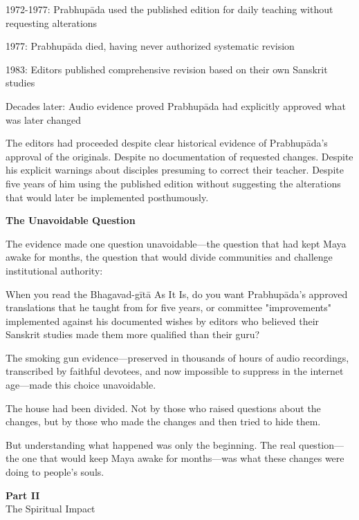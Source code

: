 \documentclass[12pt,twoside]{book}
\makeatletter
\def\cleardoublepage{\clearpage\if@twoside \ifodd\c@page\else\hbox{}\thispagestyle{empty}\newpage\if@twocolumn\hbox{}\newpage\fi\fi\fi}
\makeatother
\begin{document}
1972-1977: Prabhupāda used the published edition for daily teaching without requesting alterations

1977: Prabhupāda died, having never authorized systematic revision

1983: Editors published comprehensive revision based on their own Sanskrit studies

Decades later: Audio evidence proved Prabhupāda had explicitly approved what was later changed

The editors had proceeded despite clear historical evidence of Prabhupāda's approval of the originals. Despite no documentation of requested changes. Despite his explicit warnings about disciples presuming to correct their teacher. Despite five years of him using the published edition without suggesting the alterations that would later be implemented posthumously.


\vspace{0.5cm}
\textbf{The Unavoidable Question}
\vspace{0.2cm}


The evidence made one question unavoidable—the question that had kept Maya awake for months, the question that would divide communities and challenge institutional authority:

When you read the Bhagavad-gītā As It Is, do you want Prabhupāda's approved translations that he taught from for five years, or committee "improvements" implemented against his documented wishes by editors who believed their Sanskrit studies made them more qualified than their guru?

The smoking gun evidence—preserved in thousands of hours of audio recordings, transcribed by faithful devotees, and now impossible to suppress in the internet age—made this choice unavoidable.

The house had been divided. Not by those who raised questions about the changes, but by those who made the changes and then tried to hide them.

But understanding what happened was only the beginning. The real question—the one that would keep Maya awake for months—was what these changes were doing to people's souls.

\clearpage
\pagestyle{empty}
\vspace*{0.20\textheight}
\begin{center}
{\Huge\bfseries Part II}\\[0.5cm]
{\Large The Spiritual Impact}
\end{center}
\vspace*{\fill}
\cleardoublepage
\pagestyle{fancy}
\vspace*{0.20\textheight}
\end{document}

